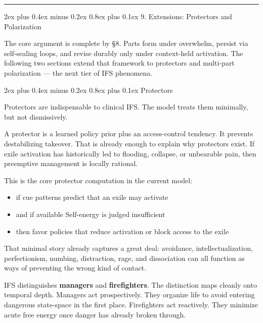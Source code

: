 \documentclass[12pt,a4paper]{article}
\makeatletter
\providecommand{\tightlist}{%
  \setlength{\itemsep}{0pt}\setlength{\parskip}{0pt}}
\renewcommand\subsection{\@startsection{subsection}{2}{0pt}%
  {2ex plus 0.4ex minus 0.2ex}%
  {0.8ex plus 0.1ex}%
  {\normalsize\itshape}}
\makeatother
\begin{document}
\begin{center}\rule{0.5\linewidth}{0.5pt}\end{center}

\subsection{9. Extensions: Protectors and
Polarization}\label{extensions-protectors-and-polarization}

The core argument is complete by §8. Parts form under overwhelm, persist
via self-sealing loops, and revise durably only under context-held
activation. The following two sections extend that framework to
protectors and multi-part polarization --- the next tier of IFS
phenomena.

\subsection{Protectors}\label{protectors}

Protectors are indispensable to clinical IFS. The model treats them
minimally, but not dismissively.

A protector is a learned policy prior plus an access-control tendency.
It prevents destabilizing takeover. That is already enough to explain
why protectors exist. If exile activation has historically led to
flooding, collapse, or unbearable pain, then preemptive management is
locally rational.

This is the core protector computation in the current model:

\begin{itemize}
\tightlist
\item
  if cue patterns predict that an exile may activate
\item
  and if available Self-energy is judged insufficient
\item
  then favor policies that reduce activation or block access to the
  exile
\end{itemize}

That minimal story already captures a great deal: avoidance,
intellectualization, perfectionism, numbing, distraction, rage, and
dissociation can all function as ways of preventing the wrong kind of
contact.

IFS distinguishes \textbf{managers} and \textbf{firefighters}. The
distinction maps cleanly onto temporal depth. Managers act
prospectively. They organize life to avoid entering dangerous
state-space in the first place. Firefighters act reactively. They
minimize acute free energy once danger has already broken through.
\end{document}
